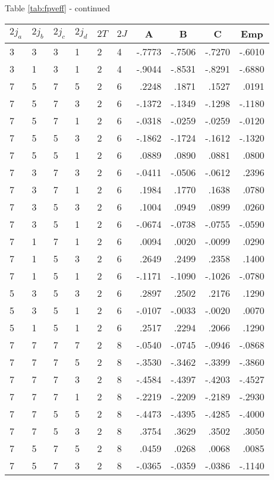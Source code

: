 \begin{center}{Table \ref{tab:fpveff} - continued}\end{center}
\clearpage
\small
\begin{center}
\begin{tabular}{llllllrrrr}
\hline
$2j_{a}$&$2j_{b}$&$2j_{c}$&$2j_{d}$&$2T$&$2J$&
\multicolumn{1}{c}{A}&
\multicolumn{1}{c}{B}&
\multicolumn{1}{c}{C}&
\multicolumn{1}{c}{Emp}
\\\hline
  3& 3& 3& 1& 2& 4&  -.7773&  -.7506&  -.7270&  -.6010\\
  3& 1& 3& 1& 2& 4&  -.9044&  -.8531&  -.8291&  -.6880\\
  7& 5& 7& 5& 2& 6&   .2248&   .1871&   .1527&   .0191\\
  7& 5& 7& 3& 2& 6&  -.1372&  -.1349&  -.1298&  -.1180\\
  7& 5& 7& 1& 2& 6&  -.0318&  -.0259&  -.0259&  -.0120\\
  7& 5& 5& 3& 2& 6&  -.1862&  -.1724&  -.1612&  -.1320\\
  7& 5& 5& 1& 2& 6&   .0889&   .0890&   .0881&   .0800\\
  7& 3& 7& 3& 2& 6&  -.0411&  -.0506&  -.0612&   .2396\\
  7& 3& 7& 1& 2& 6&   .1984&   .1770&   .1638&   .0780\\
  7& 3& 5& 3& 2& 6&   .1004&   .0949&   .0899&   .0260\\
  7& 3& 5& 1& 2& 6&  -.0674&  -.0738&  -.0755&  -.0590\\
  7& 1& 7& 1& 2& 6&   .0094&   .0020&  -.0099&   .0290\\
  7& 1& 5& 3& 2& 6&   .2649&   .2499&   .2358&   .1400\\
  7& 1& 5& 1& 2& 6&  -.1171&  -.1090&  -.1026&  -.0780\\
  5& 3& 5& 3& 2& 6&   .2897&   .2502&   .2176&   .1290\\
  5& 3& 5& 1& 2& 6&  -.0107&  -.0033&  -.0020&   .0070\\
  5& 1& 5& 1& 2& 6&   .2517&   .2294&   .2066&   .1290\\
  7& 7& 7& 7& 2& 8&  -.0540&  -.0745&  -.0946&  -.0868\\
  7& 7& 7& 5& 2& 8&  -.3530&  -.3462&  -.3399&  -.3860\\
  7& 7& 7& 3& 2& 8&  -.4584&  -.4397&  -.4203&  -.4527\\
  7& 7& 7& 1& 2& 8&  -.2219&  -.2209&  -.2189&  -.2930\\
  7& 7& 5& 5& 2& 8&  -.4473&  -.4395&  -.4285&  -.4000\\
  7& 7& 5& 3& 2& 8&   .3754&   .3629&   .3502&   .3050\\
  7& 5& 7& 5& 2& 8&   .0459&   .0268&   .0068&   .0085\\
  7& 5& 7& 3& 2& 8&  -.0365&  -.0359&  -.0386&  -.1140\\
\hline
\end{tabular}
\end{center}
